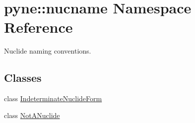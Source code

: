 \hypertarget{namespacepyne_1_1nucname}{\section{pyne\+:\+:nucname Namespace Reference}
\label{namespacepyne_1_1nucname}
}


Nuclide naming conventions.  


\subsection*{Classes}
\begin{DoxyCompactItemize}
\item 
class \hyperlink{classpyne_1_1nucname_1_1_indeterminate_nuclide_form}{Indeterminate\+Nuclide\+Form}
\item 
class \hyperlink{classpyne_1_1nucname_1_1_not_a_nuclide}{Not\+A\+Nuclide}
\end{DoxyCompactItemize}
